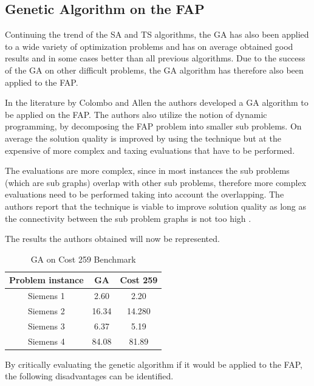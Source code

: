 \subsection{Genetic Algorithm on the FAP}
Continuing the trend of the SA and TS algorithms, the GA has also been applied to a wide variety of optimization problems and has on average obtained good results and in some cases better than all previous algorithms. Due to the success of the GA on other difficult problems, the GA algorithm has therefore also been applied to the FAP.

In the literature by Colombo and Allen\cite{ProblemDecompMIFAP} the authors developed a GA algorithm to be applied on the FAP. The authors also utilize the notion of dynamic programming, by decomposing the FAP problem into smaller sub problems. On average the solution quality is improved by using the technique but at the expensive of more complex and taxing evaluations that have to be performed\cite{ProblemDecompMIFAP}. 

The evaluations are more complex, since in most instances the sub problems (which are sub graphs) overlap with other sub problems, therefore more complex evaluations need to be performed taking into account the overlapping\cite{ProblemDecompMIFAP}. The authors report that the technique is viable to improve solution quality as long as the connectivity between the sub problem graphs is not too high \cite{ProblemDecompMIFAP}.

The results the authors obtained will now be represented.

\begin{table}
\centering
	\begin{tabular}{| c | c | c |}
	\hline
	Problem instance & GA & Cost 259 \\ \hline
	Siemens 1 & 2.60 & 2.20 \\ \hline
	Siemens 2 & 16.34 & 14.280 \\ \hline
	Siemens 3 & 6.37 & 5.19 \\ \hline
	Siemens 4 & 84.08 & 81.89 \\ \hline
	\end{tabular}
\caption{GA on Cost 259 Benchmark}
\end{table}

By critically evaluating the genetic algorithm if it would be applied to the FAP, the following disadvantages can be identified.

